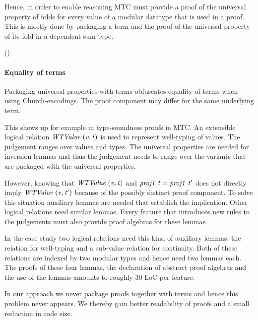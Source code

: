 Hence, in order to enable reasoning MTC must provide a proof of the
universal property of folds for every value of a modular datatype that
is used in a proof. This is mostly done by packaging a term and the
proof of the universal property of its fold in a dependent sum type.
\begin{hscode}\SaveRestoreHook
{}%
%
%
\>[3]{}\;\;\mathrel{=}\exists (\mathbin{::}\;)\hsexists {}\;\;\<[E]%
\ColumnHook
\end{hscode}\resethooks
\paragraph{Equality of terms}

Packaging universal properties with terms obfuscates equality of terms
when using Church-encodings. The proof component may differ for the
same underlying term.

This shows up for example in type-soundness proofs in MTC. An
extensible logical relation \ensuremath{\Conid{WTValue}\;(\Varid{v},\Varid{t})} is used to represent
well-typing of values. The judgement ranges over values and types. The
universal properties are needed for inversion lemmas and thus the
judgement needs to range over the variants that are packaged with the
universal properties.

However, knowing that \ensuremath{\Conid{WTValue}\;(\Varid{v},\Varid{t})} and \ensuremath{\Varid{proj1}\;\Varid{t}\mathrel{=}\Varid{proj1}\;\Varid{t'}} does
not directly imply \ensuremath{\Conid{WTValue}\;(\Varid{v},\Varid{t'})} because of the possibly distinct
proof component. To solve this situation auxiliary lemmas are needed
that establish the implication. Other logical relations need similar
lemmas. Every feature that introduces new rules to the judgements must
also provide proof algebras for these lemmas.

In the case study two logical relations need this kind of auxiliary
lemmas: the relation for well-typing and a sub-value relation for
continuity. Both of these relations are indexed by two modular types
and hence need two lemmas each. The proofs of these four lemmas, the
declaration of abstract proof algebras and the use of the lemmas
amounts to roughly 30 LoC per feature.

In our approach we never package proofs together with terms and hence
this problem never appears. We thereby gain better readability of
proofs and a small reduction in code size.


